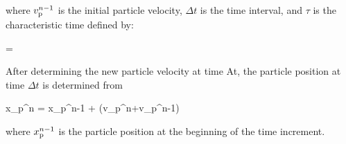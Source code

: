 where ${v_{\rm p}^{n-1}}$ is the initial particle velocity, ${\Delta t}$ is the time interval,
and ${\tau}$ is the characteristic time defined by:

%
\be
    {\tau}
    = 
  \label{eq_tau}
\ee
%

After determining the new particle velocity at time At, the particle position at time ${\Delta t}$ is determined from

%
\be
    {x_{\rm p}^n}
    = {x_{\rm p}^{n-1}} + ({v_{\rm p}^{n}}+{v_{\rm p}^{n-1}}) 
  \label{eq_updateposition}
\ee
%

where ${x_{\rm p}^{n-1}}$ is the particle position at the beginning of the time increment.
